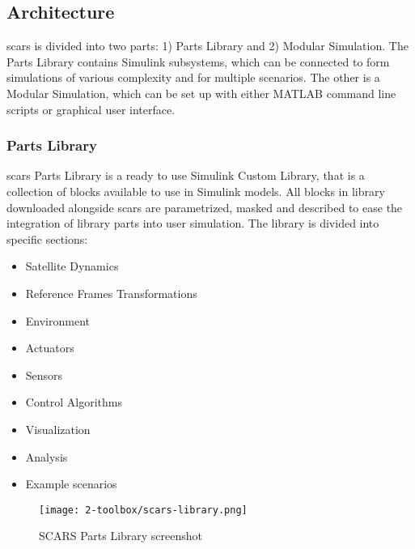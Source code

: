 
\subsection{Architecture}\label{toolbox:architecture}
    \ac{scars} is divided into two parts: 1) Parts Library and 2) Modular Simulation. The Parts Library contains Simulink subsystems, which can be connected to form simulations of various complexity and for multiple scenarios. The other is a Modular Simulation, which can be set up with either MATLAB command line scripts or graphical user interface.

    \subsubsection{Parts Library}
        \ac{scars} Parts Library is a ready to use Simulink Custom Library, that is a collection of blocks available to use in Simulink models. All blocks in library downloaded alongside \ac{scars} are parametrized, masked and described to ease the integration of library parts into user simulation. The library is divided into specific sections:
        \begin{itemize}
            \item Satellite Dynamics
            \item Reference Frames Transformations
            \item Environment
            \item Actuators
            \item Sensors
            \item Control Algorithms
            \item Visualization
            \item Analysis
            \item Example scenarios
            \end{itemize}

        \begin{figure}[H]
            \centering
            \texttt{[image: 2-toolbox/scars-library.png]}
            \caption{SCARS Parts Library screenshot}
            \label{fig:scars-library}
        \end{figure}

